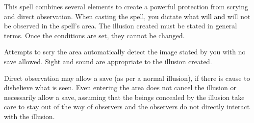 \begin{comment}
\spellsection{Rope Trick}
\spellschool{Conjuration/Transmutation (Animation, Creation, Translocation) [Planar]}
\spellskill{Planes}
\spelllvl{Arcane 5}
\spelltime{1 minute}
\spellrng{Touch}
\spelltgt{One touched piece of rope from 5 ft. to 30 ft. long}
\spelldur{\durext (D)}
\spellsave{None}
\spellsr{No}
\begin{spelleffect}
When this spell is cast upon a piece of rope from 5 to 30 feet long, one end of the rope rises into the air until the whole rope hangs perpendicular to the ground, as if affixed at the upper end. The upper end is, in fact, fastened to an extradimensional space that is outside the multiverse of extradimensional spaces (``planes''). Creatures in the extradimensional space are hidden, beyond the reach of spells (including divinations), unless those spells work across planes. The space takes the form of a cube twenty feet on each side. The rope can support up to 16,000 pounds. A weight greater than that can pull the rope free.
\par Spells cannot be cast across the extradimensional interface, nor can area effects cross it. Those in the extradimensional space can see out of it as if a 3-foot by 5-foot window were centered on the rope. The window is present on the Material Plane, but it's invisible, and even creatures that can see the window can't see through it. Anything inside the extradimensional space drops out when the spell ends. The rope can be climbed by only one person at a time. The rope trick spell enables climbers to reach a normal place if they do not climb all the way to the extradimensional space.
\par Note: It is hazardous to create an extradimensional space within an existing extradimensional space or to take an extradimensional space into an existing one.
\end{spelleffect}
\end{comment}

\spellrng{\rngclose}
\spelldur{\durext}
\begin{spelleffect}
This spell combines several elements to create a powerful protection from scrying and direct observation. When casting the spell, you dictate what will and will not be observed in the spell's area. The illusion created must be stated in general terms. Once the conditions are set, they cannot be changed.
\par Attempts to scry the area automatically detect the image stated by you with no save allowed. Sight and sound are appropriate to the illusion created.
\par Direct observation may allow a save (as per a normal illusion), if there is cause to disbelieve what is seen. Even entering the area does not cancel the illusion or necessarily allow a save, assuming that the beings concealed by the illusion take care to stay out of the way of observers and the observers do not directly interact with the illusion.
\end{spelleffect}

